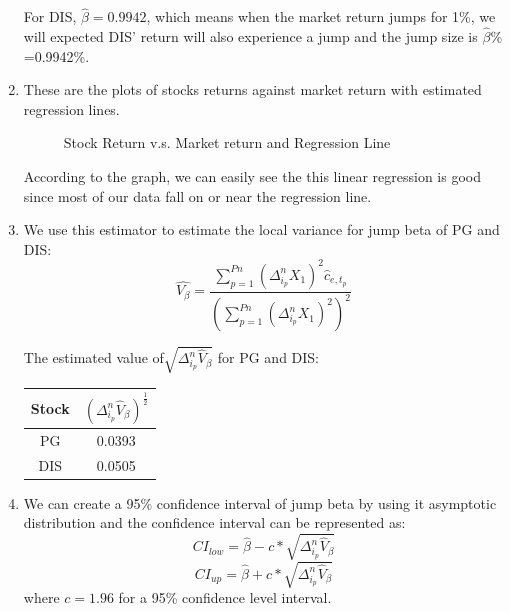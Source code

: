 \documentclass[12pt,letterpaper]{article}
\begin{document}
\begin{enumerate}[label=\textbf{(\Alph*)}]
For DIS, $\hat{\beta}=0.9942$, which means when the market return jumps for 1\%, we will expected DIS' return will also experience a  jump and the jump size is  $\hat{\beta}\%$=0.9942\%. 
\item These are the plots of stocks returns against market return with estimated regression lines.
 \begin{figure}[H]
	\centering
	\caption{ Stock Return v.s. Market return and Regression Line}
\end{figure}

According to the graph, we can easily see the this linear regression is good since most of our data fall on or near the regression line.

\item We use this estimator to estimate the local variance for jump beta of PG and DIS:
$$\hat{V_\beta}=\frac{\sum _{p=1}^{Pn}(\Delta_{i_p}^nX_1)^2\hat{c}_{e,t_p}}{(\sum _{p=1}^{Pn}(\Delta_{i_p}^nX_1)^2)^2}$$
 
The estimated value of$\sqrt{\Delta_{i_p}^n\hat{V}_\beta}$ for PG and DIS:
\begin{table}[ht]
	\centering %
	\begin{tabular}{cc} %
	\hline\hline	
		Stock&$(\Delta_{i_p}^n\hat{V}_\beta)^{\frac{1}{2}}$ \\
		\hline %
		PG&0.0393\\
		DIS&0.0505\\ %
		\hline %
	\end{tabular}
\end{table}
\item We can create a 95\% confidence interval of jump beta by using it asymptotic distribution and the confidence interval can be represented as:
$$CI_{low}=\hat{\beta}-c*\sqrt{\Delta_{i_p}^n\hat{V}_\beta}$$ 	
$$CI_{up}=\hat{\beta}+c*\sqrt{\Delta_{i_p}^n\hat{V}_\beta}$$ 
where $c=1.96$ for a 95\% confidence level interval.


\end{enumerate}
\end{document}
